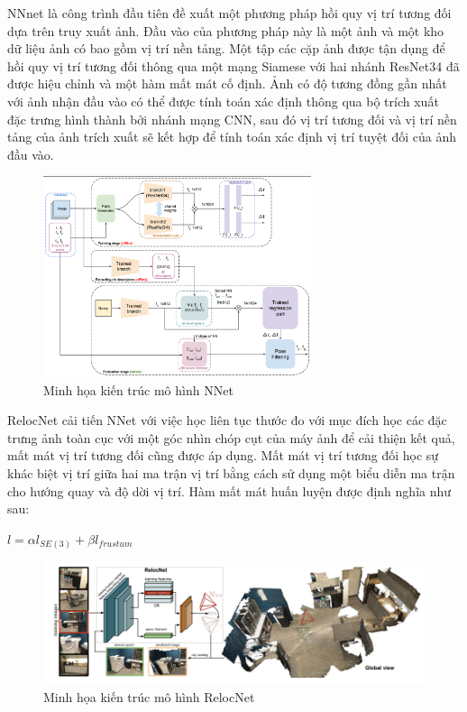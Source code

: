 NNnet \cite{laskar2017camera} là công trình đầu tiên đề xuất một phương pháp hồi quy vị trí tương đối dựa trên truy xuất ảnh. Đầu vào của phương pháp này là một ảnh và một kho dữ liệu ảnh có bao gồm vị trí nền tảng. Một tập các cặp ảnh được tận dụng để hồi quy vị trí tương đối thông qua một mạng Siamese với hai nhánh ResNet34 đã được hiệu chỉnh và một hàm mất mát cố định. Ảnh có độ tương đồng gần nhất với ảnh nhận đầu vào có thể được tính toán xác định thông qua bộ trích xuất đặc trưng hình thành bởi nhánh mạng CNN, sau đó vị trí tương đối và vị trí nền tảng của ảnh trích xuất sẽ kết hợp để tính toán xác định vị trí tuyệt đối của ảnh đầu vào.
\begin{figure}[H]
    \centering
    \includegraphics[width=0.7\textwidth]{pics/Chapter2/nnet.png}
    \caption{Minh họa kiến trúc mô hình NNet \cite{laskar2017camera}}
\end{figure}
RelocNet \cite{10.1007/978-3-030-01264-9_46} cải tiến NNet với việc học liên tục thước đo với mục đích học các đặc trưng ảnh toàn cục với một góc nhìn chóp cụt của máy ảnh để cải thiện kết quả, mất mát vị trí tương đối cũng được áp dụng. Mất mát vị trí tương đối học sự khác biệt vị trí giữa hai ma trận vị trí bằng cách sử dụng một biểu diễn ma trận cho hướng quay và độ dời vị trí. Hàm mất mát huấn luyện được định nghĩa như sau:
\begin{center}
    $l = \alpha l_{SE(3)} + \beta l_{frustum}$
\end{center}
\begin{figure}[H]
    \centering
    \includegraphics[width=\textwidth]{pics/Chapter2/relocnet.png}
    \caption{Minh họa kiến trúc mô hình RelocNet \cite{10.1007/978-3-030-01264-9_46}}
\end{figure}

